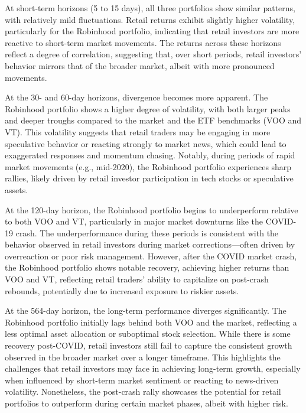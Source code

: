 At short-term horizons (5 to 15 days), all three portfolios show similar patterns, with relatively mild fluctuations. Retail returns exhibit slightly higher volatility, particularly for the Robinhood portfolio, indicating that retail investors are more reactive to short-term market movements. The returns across these horizons reflect a degree of correlation, suggesting that, over short periods, retail investors' behavior mirrors that of the broader market, albeit with more pronounced movements.

At the 30- and 60-day horizons, divergence becomes more apparent. The Robinhood portfolio shows a higher degree of volatility, with both larger peaks and deeper troughs compared to the market and the ETF benchmarks (VOO and VT). This volatility suggests that retail traders may be engaging in more speculative behavior or reacting strongly to market news, which could lead to exaggerated responses and momentum chasing. Notably, during periods of rapid market movements (e.g., mid-2020), the Robinhood portfolio experiences sharp rallies, likely driven by retail investor participation in tech stocks or speculative assets.

At the 120-day horizon, the Robinhood portfolio begins to underperform relative to both VOO and VT, particularly in major market downturns like the COVID-19 crash. The underperformance during these periods is consistent with the behavior observed in retail investors during market corrections—often driven by overreaction or poor risk management. However, after the COVID market crash, the Robinhood portfolio shows notable recovery, achieving higher returns than VOO and VT, reflecting retail traders' ability to capitalize on post-crash rebounds, potentially due to increased exposure to riskier assets.

At the 564-day horizon, the long-term performance diverges significantly. The Robinhood portfolio initially lags behind both VOO and the market, reflecting a less optimal asset allocation or suboptimal stock selection. While there is some recovery post-COVID, retail investors still fail to capture the consistent growth observed in the broader market over a longer timeframe. This highlights the challenges that retail investors may face in achieving long-term growth, especially when influenced by short-term market sentiment or reacting to news-driven volatility. Nonetheless, the post-crash rally showcases the potential for retail portfolios to outperform during certain market phases, albeit with higher risk.

